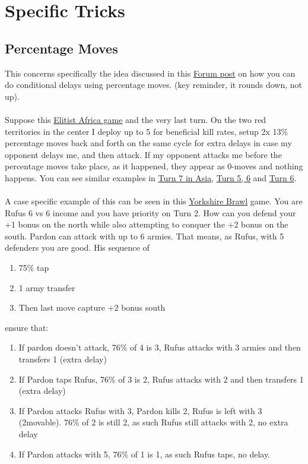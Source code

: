 \section{Specific Tricks}

\subsection{Percentage Moves}

This concerns specifically the idea discussed in this \href{https://www.warzone.com/Forum/224889-attack-percentage-conditional-moves}{Forum post} on how you can do conditional delays using percentage moves. (key reminder, it rounds down, not up).
\\
\\
Suppose this \href{https://www.warzone.com/MultiPlayer?GameID=41513918}{Elitist Africa game} and the very last turn. On the two red territories in the center I deploy up to 5 for beneficial kill rates, setup 2x 13\% percentage moves back and forth on the same cycle for extra delays in case my opponent delays me, and then attack. If my opponent attacks me before the percentage moves take place, as it happened, they appear as 0-moves and nothing happens. You can see similar examples in \href{https://www.warzone.com/MultiPlayer?GameID=34661130}{Turn 7 in Asia}, \href{https://www.warzone.com/MultiPlayer?GameID=35183711}{Turn 5, 6} and \href{https://www.warzone.com/MultiPlayer?GameID=37050920}{Turn 6}.
\\
\\
A case specific example of this can be seen in this \href{https://www.warzone.com/MultiPlayer?GameID=23344117}{Yorkshire Brawl} game. You are Rufus 6 vs 6 income and you have priority on Turn 2. How can you defend your +1 bonus on the north while also attempting to conquer the +2 bonus on the south. Pardon can attack with up to 6 armies. That means, as Rufus, with 5 defenders you are good. His sequence of 
    \begin{enumerate}
        \item 75\% tap
        \item 1 army transfer
        \item Then last move capture +2 bonus south
    \end{enumerate}
    ensure that:
    \begin{enumerate}
        \item If pardon doesn't attack, 76\% of 4 is 3, Rufus attacks with 3 armies and then transfers 1 (extra delay)
        \item If Pardon taps Rufus, 76\% of 3 is 2, Rufus attacks with 2 and then transfers 1 (extra delay)
        \item If Pardon attacks Rufus with 3, Pardon kills 2, Rufus is left with 3 (2movable). 76\% of 2 is still 2, as such Rufus still attacks with 2, no extra delay
        \item If Pardon attacks with 5, 76\% of 1 is 1, as such Rufus taps, no delay.
    \end{enumerate}

